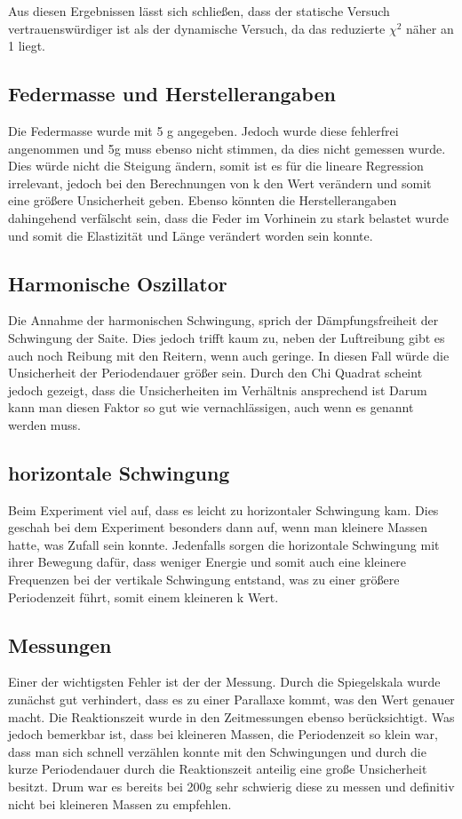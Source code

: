 \documentclass[bibliography=totocnumbered]{scrartcl}
\begin{document}
Aus diesen Ergebnissen lässt sich schließen, dass der statische Versuch vertrauenswürdiger ist als der dynamische Versuch, da das reduzierte $ \chi^{2} $ näher an 1 liegt.
	\subsection{Federmasse und Herstellerangaben}
	Die Federmasse wurde mit 5 g angegeben. Jedoch wurde diese fehlerfrei angenommen und 5g muss ebenso
	nicht stimmen, da dies nicht gemessen wurde. Dies würde nicht die Steigung ändern, somit ist es für die lineare
	Regression irrelevant, jedoch bei den Berechnungen von k den Wert verändern und somit eine größere
	Unsicherheit geben.
	Ebenso könnten die Herstellerangaben dahingehend verfälscht sein, dass die Feder im Vorhinein zu stark
	belastet wurde und somit die Elastizität und Länge verändert worden sein konnte.
	\subsection{Harmonische Oszillator}
	Die Annahme der harmonischen Schwingung, sprich der Dämpfungsfreiheit der Schwingung der Saite. Dies
	jedoch trifft kaum zu, neben der Luftreibung gibt es auch noch Reibung mit den Reitern, wenn auch geringe. In
	diesen Fall würde die Unsicherheit der Periodendauer größer sein. Durch den Chi Quadrat scheint jedoch
	gezeigt, dass die Unsicherheiten im Verhältnis ansprechend ist Darum kann man diesen Faktor so gut wie
	vernachlässigen, auch wenn es genannt werden muss.
	\subsection{horizontale Schwingung}
	Beim Experiment viel auf, dass es leicht zu horizontaler Schwingung kam. Dies geschah bei dem Experiment
	besonders dann auf, wenn man kleinere Massen hatte, was Zufall sein konnte.
	Jedenfalls sorgen die horizontale Schwingung mit ihrer Bewegung dafür, dass weniger Energie und somit auch
	eine kleinere Frequenzen bei der vertikale Schwingung entstand, was zu einer größere Periodenzeit führt, somit
	einem kleineren k Wert.
	\subsection{Messungen}
	Einer der wichtigsten Fehler ist der der Messung. Durch die Spiegelskala wurde zunächst gut verhindert, dass es
	zu einer Parallaxe kommt, was den Wert genauer macht.
	Die Reaktionszeit wurde in den Zeitmessungen ebenso berücksichtigt. Was jedoch bemerkbar ist, dass bei
	kleineren Massen, die Periodenzeit so klein war, dass man sich schnell verzählen konnte mit den Schwingungen
	und durch die kurze Periodendauer durch die Reaktionszeit anteilig eine große Unsicherheit besitzt. Drum war
	es bereits bei 200g sehr schwierig diese zu messen und definitiv nicht bei kleineren Massen zu empfehlen.
\end{document}
